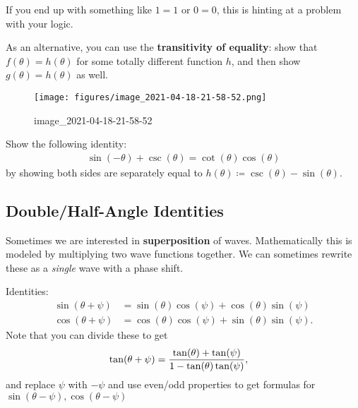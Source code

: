 \begin{warnings}

If you end up with something like \(1=1\) or \(0=0\), this is hinting at
a problem with your logic.

\end{warnings}

\begin{remark}

As an alternative, you can use the \textbf{transitivity of equality}:
show that \(f(\theta) = h(\theta)\) for some totally different function
\(h\), and then show \(g(\theta) = h(\theta)\) as well.

\begin{figure}
\centering
\texttt{[image: figures/image\_2021-04-18-21-58-52.png]}
\caption{image\_2021-04-18-21-58-52}
\end{figure}

\end{remark}

\begin{example}[?]

Show the following identity:
\begin{align*}
{\sin(-\theta) + \csc(\theta)} = \cot(\theta) \cos(\theta)
\end{align*}
by showing both sides are separately equal to
\(h(\theta) \coloneqq\csc(\theta) - \sin(\theta)\).

\end{example}

\hypertarget{doublehalf-angle-identities}{%
\subsection{Double/Half-Angle
Identities}\label{doublehalf-angle-identities}}

\begin{remark}

Sometimes we are interested in \textbf{superposition} of waves.
Mathematically this is modeled by multiplying two wave functions
together. We can sometimes rewrite these as a \emph{single} wave with a
phase shift.

\end{remark}

\begin{proposition}[?]

Identities:
\begin{align*}
\sin(\theta + \psi) &= \sin(\theta) \cos(\psi) + \cos(\theta) \sin(\psi) \\
\cos(\theta + \psi) &= \cos(\theta) \cos(\psi) + \sin(\theta) \sin(\psi)
.\end{align*}
Note that you can divide these to get
\begin{align*}
\tan(\theta + \psi) &= {\tan(\theta) + \tan(\psi) \over 1 - \tan(\theta) \tan(\psi) }
,\end{align*}
and replace \(\psi\) with \(-\psi\) and use even/odd properties to get
formulas for \(\sin(\theta - \psi), \cos(\theta - \psi)\)

\end{proposition}

